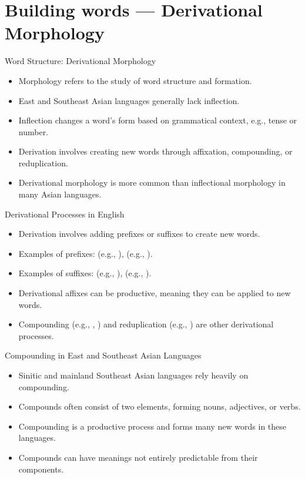 \documentclass{beamer}
\begin{document}
\section{Building words --- Derivational Morphology}


\begin{frame}{Word Structure: Derivational Morphology}
    \begin{itemize}
        \item Morphology refers to the study of word structure and formation.
        \item East and Southeast Asian languages generally lack inflection.
        \item Inflection changes a word's form based on grammatical context, e.g., tense or number.
        \item Derivation involves creating new words through affixation, compounding, or reduplication.
        \item Derivational morphology is more common than inflectional morphology in many Asian languages.
    \end{itemize}
\end{frame}

\begin{frame}{Derivational Processes in English}
    \begin{itemize}
        \item Derivation involves adding prefixes or suffixes to create new words.
        \item Examples of prefixes:  (e.g., ),  (e.g., ).
        \item Examples of suffixes:  (e.g., ),  (e.g., ).
        \item Derivational affixes can be productive, meaning they can be applied to new words.
        \item Compounding (e.g., , ) and reduplication (e.g., ) are other derivational processes.
    \end{itemize}
\end{frame}

\begin{frame}{Compounding in East and Southeast Asian Languages}
    \begin{itemize}
        \item Sinitic and mainland Southeast Asian languages rely heavily on compounding.
        \item Compounds often consist of two elements, forming nouns, adjectives, or verbs.
        \item Compounding is a productive process and forms many new words in these languages.
        \item Compounds can have meanings not entirely predictable from their components.
    \end{itemize}
\end{frame}
\end{document}
